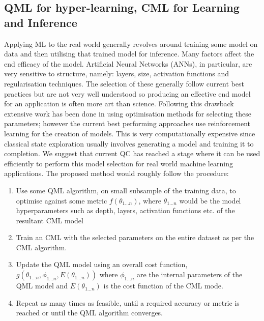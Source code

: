 \documentclass[a0,portrait]{a0poster}
\begin{document}
\begin{multicols}{2}
\section*{QML for hyper-learning, CML for Learning  and Inference}
Applying ML to the real world generally revolves around training some model on data and then utilising that trained model for inference. Many factors affect the end efficacy of the model. Artificial Neural Networks (ANNs), in particular, are very sensitive to structure, namely: layers, size, activation functions and regularisation techniques. The selection of these generally follow current best practices but are not very well understood so producing an effective end model for an application is often more art than science\cite{zoph2016neural}. Following this drawback extensive work has been done in using optimisation methods for selecting these parameters; however the current best performing approaches use reinforcement learning for the creation of models\cite{zoph2016neural}. This is very computationally expensive since classical state exploration usually involves generating a model and training it to completion. We suggest that current QC has reached a stage where it can be used efficiently to perform this model selection for real world machine learning applications. The proposed method would roughly follow the procedure:
\begin{enumerate}\color{SaddleBrown}
	\item Use some QML algorithm, on small subsample of the training data, to optimise against some metric $f(\theta_{1...n})$, where $\theta_{1...n}$ would be the model hyperparameters such as depth, layers, activation functions etc. of the resultant CML model
	\item Train an CML with the selected parameters on the entire dataset as per the CML algorithm.
	\item Update the QML model using an overall cost function, $g(\theta_{1...n}, \phi_{1...n}, E(\theta_{1...n}) )$ where $\phi_{1...n}$ are the internal parameters of the QML model and $E(\theta_{1...n})$ is the cost function of the CML mode.
	\item Repeat as many times as feasible, until a required accuracy or metric is reached or until the QML algorithm converges.
\end{enumerate}
\color{DarkSlateGrey}

\end{multicols}
\end{document}
